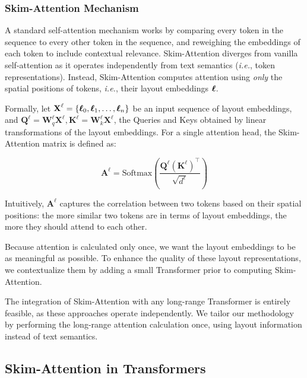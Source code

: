 \subsubsection{Skim-Attention Mechanism}

A standard self-attention mechanism works by comparing every token in the sequence to every other token in the sequence, and reweighing the embeddings of each token to include contextual relevance. Skim-Attention diverges from vanilla self-attention as it operates independently from text semantics (\textit{i.e.}, token representations). Instead, Skim-Attention computes attention  using \emph{only} the spatial positions of tokens, \textit{i.e.}, their layout embeddings $\boldsymbol{\ell}$.

Formally, let $\textbf{X}^{\ell} =  \{\boldsymbol{\ell}_0, \boldsymbol{\ell}_1, \ldots, \boldsymbol{\ell}_n\}$ be an input sequence of layout embeddings, and $\textbf{Q}^{\ell} = \textbf{W}^{\ell}_q \textbf{X}^{\ell}, \textbf{K}^{\ell} =  \textbf{W}^{\ell}_k \textbf{X}^{\ell}$, the Queries and Keys obtained by linear transformations of the layout embeddings. For a single attention head, the Skim-Attention matrix is defined as:

\begin{equation}
\label{eq:chapter3-skim-attention-matrix}
    \bm{A}^{\ell} = \text{Softmax}\left(\dfrac{\bm{Q}^{\ell}\left(\bm{K}^{\ell}\right)^\top}{\sqrt{d^{\ell}}}\right)
\end{equation}

Intuitively, $\bm{A}^{\ell}$ captures the correlation between two tokens based on their spatial positions: the more similar two tokens are in terms of layout embeddings, the more they should attend to each other. 

Because attention is calculated only once, we want the layout embeddings to be as meaningful as possible. To enhance the quality of these layout representations, we contextualize them by adding a small Transformer prior to computing Skim-Attention. 

The integration of Skim-Attention with any long-range Transformer is entirely feasible, as these approaches operate independently. We tailor our methodology by performing the long-range attention calculation once, using layout information instead of text semantics.

\subsection{Skim-Attention in Transformers}

